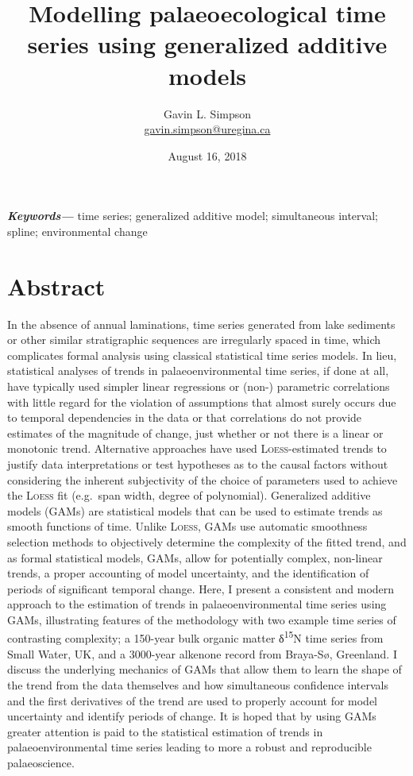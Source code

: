 \documentclass[12pt,]{article}
\title{Modelling palaeoecological time series using generalized additive models}
\author[1]{Gavin L. Simpson\\ \href{mailto:gavin.simpson@uregina.ca}{gavin.simpson@uregina.ca}}
\affil[1]{Institute of Environmental Change and Society, ~University of Regina,
Regina, Saskatchewan, Canada, S4S 0A2}
\date{August 16, 2018}
\newcommand{\loess}{\textsc{Loess}}
\begin{document}
\maketitle

\newcommand*{\keywords}[1]{\textbf{\textit{Keywords---}} #1}
    \keywords{time series; generalized additive model; simultaneous interval; spline;
environmental change}

\makeatletter
\def\fps@figure{tbp}
\makeatother


\section*{Abstract}\label{abstract}

In the absence of annual laminations, time series generated from lake
sediments or other similar stratigraphic sequences are irregularly
spaced in time, which complicates formal analysis using classical
statistical time series models. In lieu, statistical analyses of trends
in palaeoenvironmental time series, if done at all, have typically used
simpler linear regressions or (non-) parametric correlations with little
regard for the violation of assumptions that almost surely occurs due to
temporal dependencies in the data or that correlations do not provide
estimates of the magnitude of change, just whether or not there is a
linear or monotonic trend. Alternative approaches have used
\loess{}-estimated trends to justify data interpretations or test
hypotheses as to the causal factors without considering the inherent
subjectivity of the choice of parameters used to achieve the \loess{}
fit (e.g.~span width, degree of polynomial). Generalized additive models
(GAMs) are statistical models that can be used to estimate trends as
smooth functions of time. Unlike \loess{}, GAMs use automatic smoothness
selection methods to objectively determine the complexity of the fitted
trend, and as formal statistical models, GAMs, allow for potentially
complex, non-linear trends, a proper accounting of model uncertainty,
and the identification of periods of significant temporal change. Here,
I present a consistent and modern approach to the estimation of trends
in palaeoenvironmental time series using GAMs, illustrating features of
the methodology with two example time series of contrasting complexity;
a 150-year bulk organic matter δ\textsuperscript{15}N time series from
Small Water, UK, and a 3000-year alkenone record from Braya-Sø,
Greenland. I discuss the underlying mechanics of GAMs that allow them to
learn the shape of the trend from the data themselves and how
simultaneous confidence intervals and the first derivatives of the trend
are used to properly account for model uncertainty and identify periods
of change. It is hoped that by using GAMs greater attention is paid to
the statistical estimation of trends in palaeoenvironmental time series
leading to more a robust and reproducible palaeoscience.
\end{document}
